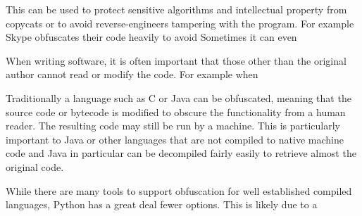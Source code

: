 \documentclass{report}
\begin{document}
This can be used to protect sensitive algorithms and intellectual
property from copycats or to avoid reverse-engineers tampering with
the program. For example Skype obfuscates their code heavily to
avoid Sometimes it can even

When writing software, it is often important that those other than
the original author cannot read or modify the code. For example
when

Traditionally a language such as C or Java can be obfuscated,
meaning that the source code or bytecode is modified to obscure the
functionality from a human reader. The resulting code may still be
run by a machine. This is particularly important to Java or other
languages that are not compiled to native machine code and Java in
particular can be decompiled fairly easily to retrieve almost the
original code.

While there are many tools to support obfuscation for well
established compiled languages, Python has a great deal fewer
options. This is likely due to a
\end{document}
